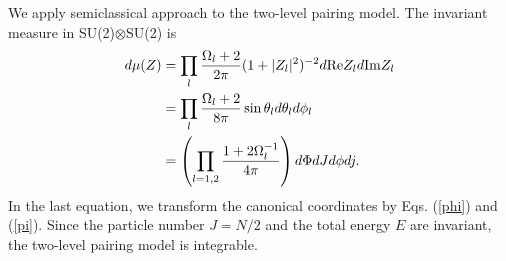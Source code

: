 \documentclass[%
superscriptaddress,
preprint,
showpacs,
nofootinbib,
amsmath,amssymb,
prc,
floatfix ]%
{revtex4-1}
\begin{document}
We apply semiclassical approach to the two-level pairing model.
The invariant measure in SU(2)$\otimes$SU(2) is 
\begin{align}
d\mu(Z) &= \prod_l \frac{\Omega_l+2}{2\pi}(1+|Z_l|^2)^{-2}d{\rm Re}Z_ld{\rm Im}Z_l \\
  &= \prod_l \frac{\Omega_l+2}{8\pi}\sin{\theta_l}d\theta_ld\phi_l \\
	&= \left(\prod_{l=1,2} \frac{1+2\Omega_l^{-1}}{4\pi}\right)
             d\Phi dJ d\phi dj .
\end{align}
In the last equation, we transform the canonical coordinates
by Eqs. (\ref{phi}) and (\ref{pi}).
Since the particle number $J=N/2$ and the total energy $E$ are invariant,
the two-level pairing model is integrable.
\end{document}
